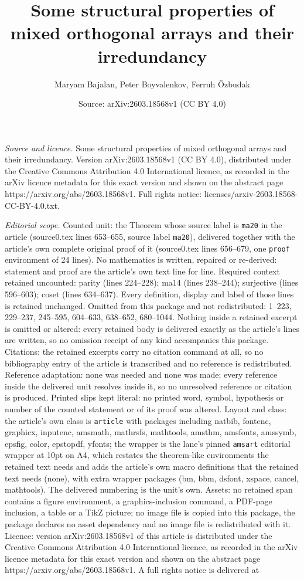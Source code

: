 \documentclass[10pt,a4paper]{amsart}
\title[Some structural properties of mixed orthogonal arrays and th]{Some structural properties of mixed orthogonal arrays and their irredundancy}
\author{Maryam Bajalan, Peter Boyvalenkov, Ferruh \"Ozbudak}
\date{Source: arXiv:2603.18568v1 (CC BY 4.0)}
\begin{document}
\maketitle

\noindent\emph{Source and licence.} Some structural properties of mixed orthogonal arrays and their irredundancy. Version arXiv:2603.18568v1 (CC BY 4.0), distributed under the Creative Commons Attribution 4.0 International licence, as recorded in the arXiv licence metadata for this exact version and shown on the abstract page https://arxiv.org/abs/2603.18568v1. Full rights notice: licenses/arxiv-2603.18568-CC-BY-4.0.txt.\par\smallskip

\noindent\textit{Editorial scope.} Counted unit: the Theorem whose source label is \texttt{ma20} in the article (source0.tex lines 653--655, source label \texttt{ma20}), delivered together with the article's own complete original proof of it (source0.tex lines 656--679, one \texttt{proof} environment of 24 lines). No mathematics is written, repaired or re-derived: statement and proof are the article's own text line for line. Required context retained uncounted: parity (lines 224--228); ma14 (lines 238--244); surjective (lines 596--603); coset (lines 634--637). Every definition, display and label of those lines is retained unchanged. Omitted from this package and not redistributed: 1--223, 229--237, 245--595, 604--633, 638--652, 680--1044. Nothing inside a retained excerpt is omitted or altered: every retained body is delivered exactly as the article's lines are written, so no omission receipt of any kind accompanies this package. Citations: the retained excerpts carry no citation command at all, so no bibliography entry of the article is transcribed and no reference is redistributed. Reference adaptation: none was needed and none was made; every reference inside the delivered unit resolves inside it, so no unresolved reference or citation is produced. Printed slips kept literal: no printed word, symbol, hypothesis or number of the counted statement or of its proof was altered. Layout and class: the article's own class is \texttt{article} with packages including natbib, fontenc, graphicx, inputenc, amsmath, mathrsfs, mathtools, amsthm, amsfonts, amssymb, epsfig, color, epstopdf, yfonts; the wrapper is the lane's pinned \texttt{amsart} editorial wrapper at 10pt on A4, which restates the theorem-like environments the retained text needs and adds the article's own macro definitions that the retained text needs (none), with extra wrapper packages (bm, bbm, dsfont, xspace, cancel, mathtools). The delivered numbering is the unit's own. Assets: no retained span contains a figure environment, a graphics-inclusion command, a PDF-page inclusion, a table or a TikZ picture; no image file is copied into this package, the package declares no asset dependency and no image file is redistributed with it. Licence: version arXiv:2603.18568v1 of this article is distributed under the Creative Commons Attribution 4.0 International licence, as recorded in the arXiv licence metadata for this exact version and shown on the abstract page https://arxiv.org/abs/2603.18568v1. A full rights notice is delivered at 
\end{document}
